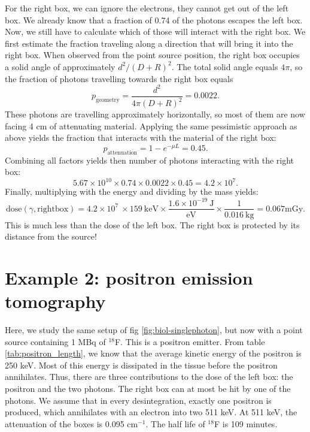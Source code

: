For the right box, we can ignore the electrons, they cannot get out of the
left box.  We already know that a fraction of 0.74 of the photons escapes the
left box. Now, we still have to calculate which of those will interact with
the right box. We first estimate the fraction traveling along a direction that
will bring it into the right box.  When observed from the point source
position, the right box occupies a solid angle of approximately $d^2 / (D +
R)^2$. The total solid angle equals $4 \pi$, so the fraction of photons
travelling towards the right box equals
\begin{equation}
  p_{\mbox{geometry}} = \frac{d^2}{4 \pi (D + R)^2} = 0.0022.
\end{equation}
These photons are travelling approximately horizontally, so most of them are
now facing 4 cm of attenuating material. Applying the same pessimistic
approach as above yields the fraction that interacts with the material of the
right box:
\begin{equation}
  p_{\mbox{attenuation}} = 1 - e^{- \mu L} = 0.45.
\end{equation}
Combining all factors yields then number of photons interacting with the right box:
\begin{equation}
  5.67 \times 10^{10} \times 0.74 \times 0.0022 \times 0.45 = 4.2 \times 10^7.
\end{equation}
Finally, multiplying with the energy and dividing by the mass yields:
\begin{equation}
  \mbox{dose}(\gamma, \mbox{rightbox}) = 4.2 \times 10^7\ \times 159\ \mbox{keV}
  \times \frac{1.6 \times 10^{-19} \ \mbox{J}}{\mbox{eV}}
   \times \frac{1}{ 0.016 \ \mbox{kg}}
   = 0.067 \mbox{mGy}.
\end{equation}
This is much less than the dose of the left box. The right box is protected by its
distance from the source!


\section{Example 2: positron emission tomography}
Here, we study the same setup of fig \ref{fig:biol-singlephoton}, but
now with a point source containing 1 MBq of $^{18}$F. This is a
positron emitter. From table \ref{tab:positron_length}, we know that
the average kinetic energy of the positron is 250 keV. Most of this
energy is dissipated in the tissue before the positron
annihilates. Thus, there are three contributions to the dose of the
left box: the positron and the two photons. The right box can at most
be hit by one of the photons.
%
We assume that in every desintegration, exactly one positron is
produced, which annihilates with an electron into two 511 keV.  At 511
keV, the attenuation of the boxes is 0.095 cm$^{-1}$. The half life of
$^{18}$F is 109 minutes.

